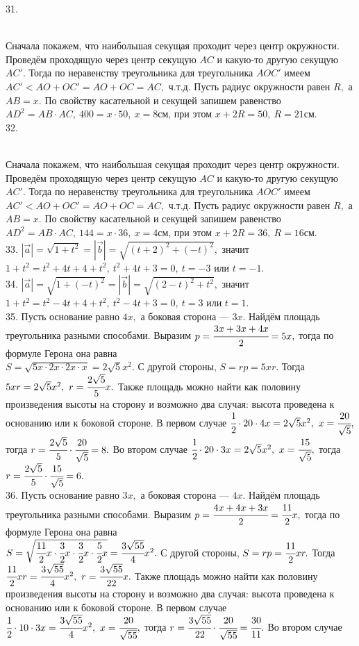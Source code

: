 31. \begin{figure}[ht!]
\end{figure}\\
Сначала покажем, что наибольшая секущая проходит через центр окружности. Проведём проходящую через центр секущую $AC$ и какую-то другую секущую $AC'.$ Тогда по неравенству треугольника для треугольника $AOC'$ имеем $AC'<AO+OC'=AO+OC=AC,$ ч.т.д. Пусть радиус окружности равен $R,$ а $AB=x.$ По свойству касательной и секущей
запишем равенство $AD^2=AB\cdot AC,\ 400=x\cdot 50,\ x=8$см, при этом $x+2R=50,\ R=21$см.\\
32. \begin{figure}[ht!]
\end{figure}\\
Сначала покажем, что наибольшая секущая проходит через центр окружности. Проведём проходящую через центр секущую $AC$ и какую-то другую секущую $AC'.$ Тогда по неравенству треугольника для треугольника $AOC'$ имеем $AC'<AO+OC'=AO+OC=AC,$ ч.т.д. Пусть радиус окружности равен $R,$ а $AB=x.$ По свойству касательной и секущей
запишем равенство $AD^2=AB\cdot AC,\ 144=x\cdot 36,\ x=4$см, при этом $x+2R=36,\ R=16$см.\\
33. $|\vec{a}|=\sqrt{1+t^2}=|\vec{b}|=\sqrt{(t+2)^2+(-t)^2},$ значит $1+t^2=t^2+4t+4+t^2,\ t^2+4t+3=0,\ t=-3$ или $t=-1.$\\
34. $|\vec{a}|=\sqrt{1+(-t)^2}=|\vec{b}|=\sqrt{(2-t)^2+t^2},$ значит $1+t^2=t^2-4t+4+t^2,\ t^2-4t+3=0,\ t=3$ или $t=1.$\\
35. Пусть основание равно $4x,$ а боковая сторона --- $3x.$ Найдём площадь треугольника разными способами. Выразим $p=\cfrac{3x+3x+4x}{2}=5x,$ тогда по формуле Герона она равна \\$S=\sqrt{5x\cdot2x\cdot 2x\cdot x}=2\sqrt{5}x^2.$ С другой стороны, $S=rp=5xr.$ Тогда $5xr=2\sqrt{5}x^2,\ r=\cfrac{2\sqrt{5}}{5}x.$ Также площадь можно найти как половину произведения высоты на сторону и возможно два случая: высота проведена к основанию или к боковой стороне. В первом случае $\cfrac{1}{2}\cdot20\cdot4x=2\sqrt{5}x^2,\ x=\cfrac{20}{\sqrt{5}},$ тогда $r=\cfrac{2\sqrt{5}}{5}\cdot\cfrac{20}{\sqrt{5}}=8.$ Во втором случае
$\cfrac{1}{2}\cdot20\cdot3x=2\sqrt{5}x^2,\ x=\cfrac{15}{\sqrt{5}},$ тогда $r=\cfrac{2\sqrt{5}}{5}\cdot\cfrac{15}{\sqrt{5}}=6.$\\
36. Пусть основание равно $3x,$ а боковая сторона --- $4x.$ Найдём площадь треугольника разными способами. Выразим $p=\cfrac{4x+4x+3x}{2}=\cfrac{11}{2}x,$ тогда по формуле Герона она равна \\$S=\sqrt{\cfrac{11}{2}x\cdot\cfrac{3}{2}x\cdot \cfrac{3}{2}x\cdot \cfrac{5}{2}x}=\cfrac{3\sqrt{55}}{4}x^2.$ С другой стороны, $S=rp=\cfrac{11}{2}xr.$ Тогда $\cfrac{11}{2}xr=\cfrac{3\sqrt{55}}{4}x^2,\ r=\cfrac{3\sqrt{55}}{22}x.$ Также площадь можно найти как половину произведения высоты на сторону и возможно два случая: высота проведена к основанию или к боковой стороне. В первом случае $\cfrac{1}{2}\cdot10\cdot3x=\cfrac{3\sqrt{55}}{4}x^2,\ x=\cfrac{20}{\sqrt{55}},$ тогда $r=\cfrac{3\sqrt{55}}{22}\cdot\cfrac{20}{\sqrt{55}}=\cfrac{30}{11}.$ Во втором случае
